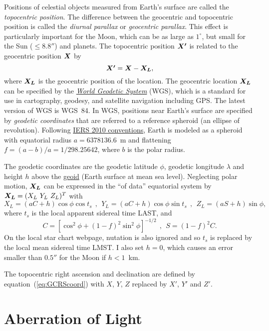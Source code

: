 \documentclass[12pt]{article}
\newcommand \beq {\begin{equation}}
\newcommand \eeq {\end{equation}}
\newcommand{\ve}[1]{\mbox{\boldmath $#1$}}
\begin{document}
Positions of celestial objects measured from Earth's surface are called 
the {\em topocentric position}. The difference between the geocentric 
and topocentric position is called the {\em diurnal parallax} or 
{\em geocentric parallax}. This effect is particularly important for the Moon, 
which can be as large as $1^\circ$, but small for the Sun ($\leq 8.8''$) and planets. 
The topocentric position $\ve{X'}$ is related to the geocentric position $\ve{X}$ by 
\beq
  \ve{X'} = \ve{X} - \ve{X_L} ,
\label{eq:topoX}
\eeq
where $\ve{X_L}$ is the geocentric position of the location. The geocentric 
location $\ve{X_L}$ can be specified by the 
\href{https://en.wikipedia.org/wiki/World_Geodetic_System}{\em World Geodetic System} (WGS), 
which is a standard for use in cartography, geodesy, and satellite navigation including GPS. 
The latest version of WGS is WGS~84. 
In WGS, positions near Earth's surface are specified by {\em geodetic coordinates} 
that are referred to a reference spheroid (an ellipse of revolution). Following 
\href{https://www.iers.org/IERS/EN/Publications/TechnicalNotes/tn36.html}{IERS 2010 
conventions}, Earth is modeled as a spheroid with equatorial radius $a=6378136.6$~m 
and flattening $f=(a-b)/a=1/298.25642$, where $b$ is the polar radius.

The geodetic coordinates are the geodetic latitude $\phi$, geodetic longitude $\lambda$ and 
height $h$ above the \href{https://en.wikipedia.org/wiki/Geoid}{geoid} 
(Earth surface at mean sea level). Neglecting polar motion, $\ve{X_L}$ can be 
expressed in the ``of data'' equatorial system by $\ve{X_L}=(X_L\ Y_L\ Z_L)^T$ with 
\beq
 X_L = (aC + h)\cos \phi \cos t_s \ \ , \ \ 
 Y_L = (aC + h)\cos \phi \sin t_s \ \ , \ \ 
 Z_L = (aS + h) \sin \phi , 
\label{eq:XL}
\eeq
where $t_s$ is the local apparent sidereal time LAST, and 
\beq
  C = [\cos^2 \phi + (1-f)^2 \sin^2 \phi]^{-1/2} \ \ , \ \ 
  S = (1-f)^2 C .
\label{eq:topoCS}
\eeq
On the local star chart webpage, nutation is also ignored and so $t_s$ 
is replaced by the local mean sidereal time LMST. I also set $h=0$, which 
causes an error smaller than $0.5''$ for the Moon if $h<1$~km. 

The topocentric right ascension and declination are defined by 
equation~(\ref{eq:GCRScoord}) with $X$, $Y$, $Z$ replaced by $X'$, $Y'$ and 
$Z'$.

\section{Aberration of Light} 
\end{document}
